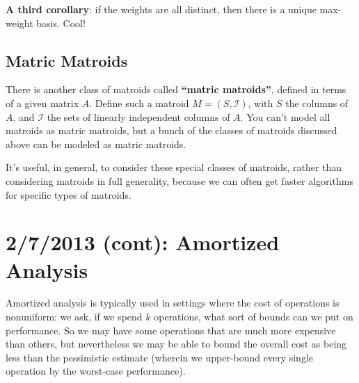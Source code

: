 \documentclass{article}
\newcommand{\I}{\mathcal{I}}
\begin{document}
\textbf{A third corollary}: if the weights are all distinct, then there
is a unique max-weight basis.
Cool!

\subsection{Matric Matroids}

There is another class of matroids called \textbf{``matric matroids''},
defined in terms of a given matrix $A$.
Define such a matroid $M=(S,\I)$, with $S$ the columns of $A$, and
$\I$ the sets of linearly independent columns of $A$.
You can't model all matroids as matric matroids, but a bunch of the classes
of matroids discussed above can be modeled as matric matroids.

It's useful, in general, to consider these special classes of matroids,
rather than considering matroids in full generality, because we can
often get faster algorithms for specific types of matroids.


\section{2/7/2013 (cont): Amortized Analysis}

Amortized analysis is typically used in settings where the cost of
operations is nonuniform: we ask, if we spend $k$ operations, what sort
of bounds can we put on performance.
So we may have some operations that are much more expensive than others, but
nevertheless we may be able to bound the overall cost as being less than the 
pessimistic estimate (wherein we upper-bound
every single operation by the worst-case performance).
\end{document}
